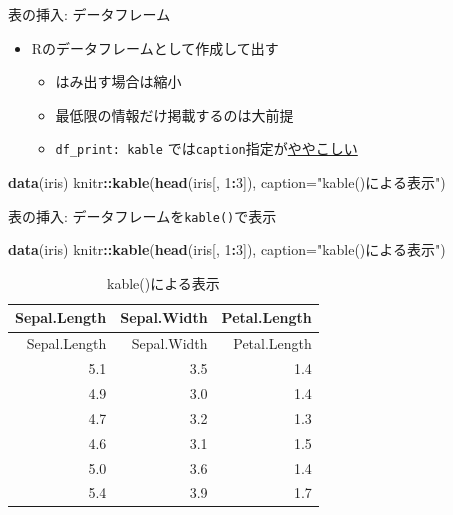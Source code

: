\documentclass[
  14pt,
  ignorenonframetext,
]{beamer}
\newenvironment{Shaded}{\begin{snugshade}}{\end{snugshade}}
\newcommand{\DataTypeTok}[1]{\textcolor[rgb]{0.13,0.29,0.53}{#1}}
\newcommand{\DecValTok}[1]{\textcolor[rgb]{0.00,0.00,0.81}{#1}}
\newcommand{\KeywordTok}[1]{\textcolor[rgb]{0.13,0.29,0.53}{\textbf{#1}}}
\newcommand{\NormalTok}[1]{#1}
\newcommand{\OperatorTok}[1]{\textcolor[rgb]{0.81,0.36,0.00}{\textbf{#1}}}
\newcommand{\StringTok}[1]{\textcolor[rgb]{0.31,0.60,0.02}{#1}}
\providecommand{\tightlist}{%
  \setlength{\itemsep}{0pt}\setlength{\parskip}{0pt}}
\begin{document}
\begin{frame}[fragile]{表の挿入: データフレーム}
\protect\hypertarget{ux8868ux306eux633fux5165-ux30c7ux30fcux30bfux30d5ux30ecux30fcux30e0}{}

\begin{itemize}
\tightlist
\item
  Rのデータフレームとして作成して出す

  \begin{itemize}
  \tightlist
  \item
    はみ出す場合は縮小
  \item
    最低限の情報だけ掲載するのは大前提
  \item
    \texttt{df\_print:\ kable}
    では\texttt{caption}指定が\href{https://stackoverflow.com/questions/48410861/how-to-add-table-caption-using-df-print}{ややこしい}
  \end{itemize}
\end{itemize}

\begin{Shaded}
\begin{Highlighting}[]
\KeywordTok{data}\NormalTok{(iris)}
\NormalTok{knitr}\OperatorTok{::}\KeywordTok{kable}\NormalTok{(}\KeywordTok{head}\NormalTok{(iris[, }\DecValTok{1}\OperatorTok{:}\DecValTok{3}\NormalTok{]),}
             \DataTypeTok{caption=}\StringTok{"kable()による表示"}\NormalTok{)}
\end{Highlighting}
\end{Shaded}

\end{frame}

\begin{frame}[fragile]{表の挿入: データフレームを\texttt{kable()}で表示}
\protect\hypertarget{ux8868ux306eux633fux5165-ux30c7ux30fcux30bfux30d5ux30ecux30fcux30e0ux3092kableux3067ux8868ux793a}{}

\begin{Shaded}
\begin{Highlighting}[]
\KeywordTok{data}\NormalTok{(iris)}
\NormalTok{knitr}\OperatorTok{::}\KeywordTok{kable}\NormalTok{(}\KeywordTok{head}\NormalTok{(iris[, }\DecValTok{1}\OperatorTok{:}\DecValTok{3}\NormalTok{]),}
             \DataTypeTok{caption=}\StringTok{"kable()による表示"}\NormalTok{)}
\end{Highlighting}
\end{Shaded}

\begin{longtable}[]{@{}rrr@{}}
\caption{kable()による表示}\tabularnewline
\toprule
Sepal.Length & Sepal.Width & Petal.Length\tabularnewline
\midrule
\endfirsthead
\toprule
Sepal.Length & Sepal.Width & Petal.Length\tabularnewline
\midrule
\endhead
5.1 & 3.5 & 1.4\tabularnewline
4.9 & 3.0 & 1.4\tabularnewline
4.7 & 3.2 & 1.3\tabularnewline
4.6 & 3.1 & 1.5\tabularnewline
5.0 & 3.6 & 1.4\tabularnewline
5.4 & 3.9 & 1.7\tabularnewline
\bottomrule
\end{longtable}

\end{frame}
\end{document}
